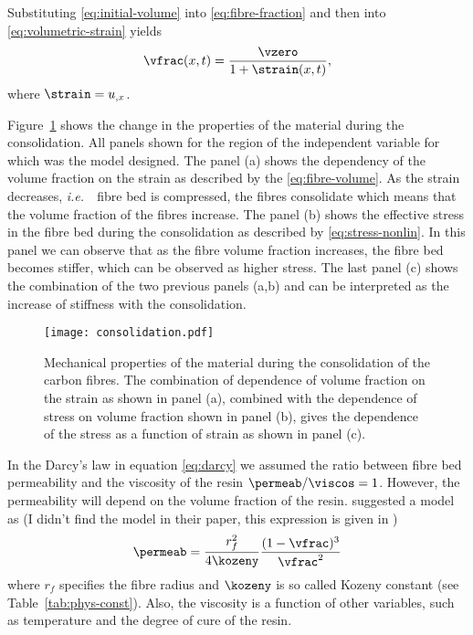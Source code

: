 \documentclass[twoside,a4paper,12pt]{article}
\newcommand{\figref}[1]{Figure~\ref{#1}}
\newcommand{\tabref}[1]{Table~\ref{#1}}
\newcommand{\ie}{{\it i.e.\ }}
\newcommand{\note}[1]{{\color{red}(#1)}}
\begin{document}
Substituting \eqref{eq:initial-volume} into \eqref{eq:fibre-fraction}
and then into \eqref{eq:volumetric-strain} yields
%
\begin{align}
  \vfrac(x,t) = \frac{\vzero}{1+\strain(x,t)}, \label{eq:fibre-volume}
\end{align}
%
where $\strain =  u_{,x}$.

\figref{fig:consolidation} shows the change in the properties of the material during the consolidation. All panels shown for the region of the independent variable for which was the model designed. The panel (a) shows the dependency of the volume fraction on the strain as described by the \eqref{eq:fibre-volume}. As the strain decreases, \ie\ fibre bed is compressed, the fibres consolidate which means that the volume fraction of the fibres increase. The panel (b) shows the effective stress in the fibre bed during the consolidation as described by \eqref{eq:stress-nonlin}. In this panel we can observe that as the fibre volume fraction increases, the fibre bed becomes stiffer, which can be observed as higher stress. The last panel (c) shows the combination of the two previous panels (a,b) and can be interpreted as the increase of stiffness with the consolidation.
%
\begin{figure}
  \centering
  \texttt{[image: consolidation.pdf]}
  \caption{Mechanical properties of the material during the consolidation of the carbon fibres. The combination of dependence of volume fraction on the strain as shown in panel (a), combined with the dependence of stress on volume fraction shown in panel (b), gives the dependence of the stress as a function of strain as shown in panel (c).}
  \label{fig:consolidation}
\end{figure}

In the Darcy's law in equation \eqref{eq:darcy} we assumed the ratio
between fibre bed permeability and the viscosity of the resin
$\permeab/\viscos=1$. However, the permeability will depend on the volume
fraction of the resin. \citet{Dave1987b} suggested a model as
%
\note{I didn't find the model in their paper, this expression is given in \citet{Hubert1999}}
%
\begin{align}
  \permeab = \frac{r_f^2}{4\kozeny} \frac{(1-\vfrac)^3}{\vfrac^2} \label{eq:permeability}
\end{align}
%
where $r_f$ specifies the fibre radius and $\kozeny$ is so called Kozeny
constant (see \tabref{tab:phys-const}). Also, the viscosity is a
function of other variables, such as temperature and the degree of
cure of the resin.
\end{document}

